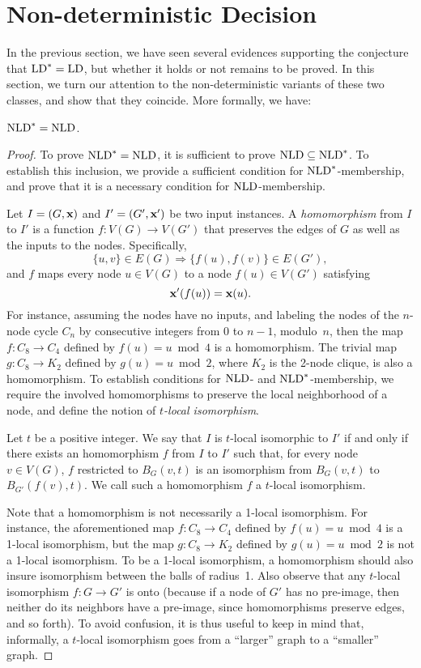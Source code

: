 \documentclass{llncs}
\newcommand{\inp}{\mbox{\rm\bf x}}
\newcommand{\LD}{\mbox{\rm LD}}
\newcommand{\NLD}{\mbox{\rm NLD}}
\begin{document}
\section{Non-deterministic Decision}
\label{sec:ndd}


In the previous section, we have seen several evidences supporting the conjecture that $\LD^*=\LD$, but whether it holds or not remains to be proved. In this section, we turn our attention to the non-deterministic variants of these two classes, and show that they coincide. More formally, we have:  

\begin{theorem}\label{theo:NLD=NLD}
$\NLD^*=\NLD$.
\end{theorem}

\begin{proof}
To prove $\NLD^*=\NLD$, it is sufficient to prove $\NLD\subseteq\NLD^* $. To establish this inclusion, we provide a sufficient condition for $\NLD^*$-membership, and prove that it is a necessary condition for  $\NLD$-membership. 

Let $I=(G,\inp)$ and $I'=(G',\inp')$ be two input instances. A \emph{homomorphism} from $I$ to $I'$ is a function $f:V(G)\to V(G')$ that preserves the edges of $G$ as well as the inputs to the nodes. Specifically, 
\[
\{u,v\}\in E(G) \Rightarrow \{f(u),f(v)\}\in E(G'),\] 
and $f$ maps every node $u\in V(G)$ to a node $f(u)\in V(G')$ satisfying $$\inp'(f(u))=\inp(u).$$ For instance, assuming the nodes have no inputs, and labeling the nodes of the $n$-node cycle $C_n$ by consecutive integers from 0 to $n-1$, modulo~$n$, then the map $f:C_8\to C_4$ defined by $f(u)=u\bmod 4$ is a homomorphism. The trivial map $g:C_8\to K_2$ defined by $g(u)=u\bmod 2$, where $K_2$ is the 2-node clique, is also a homomorphism. To establish conditions for $\NLD$- and $\NLD^*$-membership, we require the involved homomorphisms to preserve the local neighborhood of a node, and define the notion of \emph{$t$-local isomorphism}.  

Let $t$ be a positive integer. We say that $I$ is $t$-local isomorphic to $I'$ if and only if there exists an homomorphism $f$ from $I$ to $I'$ such that,  for every node $v\in V(G)$, $f$ restricted to $B_G(v,t)$ is an isomorphism from  $B_G(v,t)$ to $B_{G'}(f(v),t)$. We call such a homomorphism $f$ a $t$-local isomorphism. 

Note that a homomorphism is not necessarily a 1-local isomorphism. For instance, the aforementioned map $f:C_8\to C_4$ defined by $f(u)=u\bmod 4$ is a 1-local isomorphism, but the map $g:C_8\to K_2$ defined by $g(u)=u\bmod 2$ is not a 1-local isomorphism. 
To be a 1-local isomorphism, a homomorphism should also insure isomorphism between the balls of radius~1. Also observe that any $t$-local isomorphism $f: G \to G'$ is onto (because if a node of $G'$ has no pre-image, then neither do its neighbors have a pre-image, since  homomorphisms preserve edges, and so forth). To avoid confusion, it is thus useful to keep in mind that, informally, a $t$-local isomorphism goes from a ``larger'' graph to a ``smaller'' graph. 


\end{proof}
\end{document}
